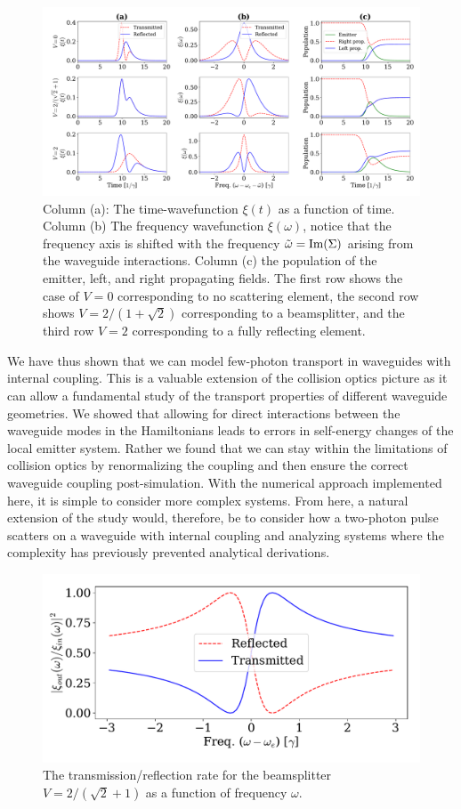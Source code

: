 \begin{figure}[H]
    \centering
    \includegraphics[width=\linewidth]{figures/Fanoscattering.pdf}
    \caption{Column (a): The time-wavefunction $\xi(t)$ as a function of time. Column (b) The frequency wavefunction $\xi(\omega)$, notice that the frequency axis is shifted with the frequency $\Tilde{\omega} = \mathrm{Im}(\Sigma)$ arising from the waveguide interactions. Column (c) the population of the emitter, left, and right propagating fields. The first row shows the case of $V=0$ corresponding to no scattering element, the second row shows $V=2/(1+\sqrt{2})$ corresponding to a beamsplitter, and the third row $V=2$ corresponding to a fully reflecting element.  }
    \label{fig:fanoIO}
\end{figure}


We have thus shown that we can model few-photon transport in waveguides with internal coupling. This is a valuable extension of the collision optics picture as it can allow a fundamental study of the transport properties of different waveguide geometries. We showed that allowing for direct interactions between the waveguide modes in the Hamiltonians leads to errors in self-energy changes of the local emitter system. Rather we found that we can stay within the limitations of collision optics by renormalizing the coupling and then ensure the correct waveguide coupling post-simulation. With the numerical approach implemented here, it is simple to consider more complex systems. From here, a natural extension of the study would, therefore, be to consider how a two-photon pulse scatters on a waveguide with internal coupling and analyzing systems where the complexity has previously prevented analytical derivations.

\begin{figure}
    \centering
    \includegraphics[width=0.5 \linewidth]{figures/fano_transmission.pdf}
    \caption{The transmission/reflection rate for the beamsplitter $V=2/(\sqrt{2}+1)$ as a function of frequency $\omega$. }
    \label{fig:fano_transmission}
\end{figure}